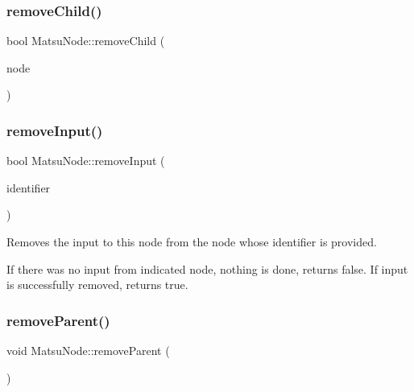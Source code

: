 \mbox{\label{classMatsuNode_a0e170c6154bbc7ba1f668f7d0a9ac274}} 
\subsubsection{\texorpdfstring{remove\+Child()}{removeChild()}\hspace{0.1cm}{\footnotesize\ttfamily [2/2]}}
{\footnotesize\ttfamily bool Matsu\+Node\+::remove\+Child (\begin{DoxyParamCaption}\item[{\mbox{\hyperlink{classMatsuNode}{Matsu\+Node}} \&}]{node }\end{DoxyParamCaption})}

\mbox{\label{classMatsuNode_a70d3d593cb1ebb8a909bfc743867d348}} 
\subsubsection{\texorpdfstring{remove\+Input()}{removeInput()}}
{\footnotesize\ttfamily bool Matsu\+Node\+::remove\+Input (\begin{DoxyParamCaption}\item[{unsigned}]{identifier }\end{DoxyParamCaption})}



Removes the input to this node from the node whose identifier is provided. 

If there was no input from indicated node, nothing is done, returns false. If input is successfully removed, returns true. \mbox{\label{classMatsuNode_aadd9d80a48b3c5f2bcfed3801f644e24}} 
\subsubsection{\texorpdfstring{remove\+Parent()}{removeParent()}}
{\footnotesize\ttfamily void Matsu\+Node\+::remove\+Parent (\begin{DoxyParamCaption}{ }\end{DoxyParamCaption})}

